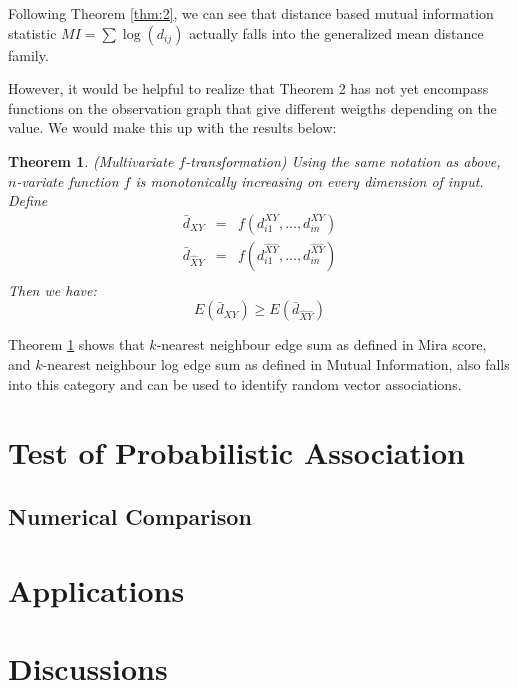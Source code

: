 \documentclass[12pt,letterpaper]{article}
\newtheorem{thm}{Theorem}
\begin{document}
Following Theorem \ref{thm:2}, we can see that distance based mutual
information statistic $MI = \sum \log(d_{ij})$ actually falls into the
generalized mean distance family.

However, it would be helpful to realize that Theorem 2 has not yet
encompass functions on the observation graph that give different
weigths depending on the value. We would make this up with the results below: 

\begin{thm}
  \label{thm:3}
  (Multivariate $f$-transformation) Using the same notation as above,
  $n$-variate function $f$ is monotonically increasing on every
  dimension of input. Define
  \begin{eqnarray*}
    \bar{d}_{XY} &=& f(d^{XY}_{i1},\ldots,d^{XY}_{in})\\ 
    \bar{d}_{\hat{X}\hat{Y}} &=& f(d^{\hat{X}\hat{Y}}_{i1},\ldots,d^{\hat{X}\hat{Y}}_{in})\\
  \end{eqnarray*}
  Then we have:
  \begin{displaymath}
    E(\bar{d}_{XY}) \ge E(\bar{d}_{\hat{X}\hat{Y}})
  \end{displaymath}
\end{thm}

Theorem \ref{thm:3} shows that $k$-nearest neighbour edge sum as
defined in Mira score, and $k$-nearest neighbour log edge sum as
defined in Mutual Information, also falls into this category and can
be used to identify random vector associations. 

\section{Test of Probabilistic Association}
\label{sec:tests}

\subsection{Numerical Comparison}
\label{sec:numerical-results}

\section{Applications}
\label{sec:application}

\section{Discussions}
\label{sec:discussion}
\end{document}
